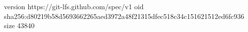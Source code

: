 version https://git-lfs.github.com/spec/v1
oid sha256:d80219b58d5693662265aed3972a48f21315dfec518c34c151621512ed6fc936
size 43840
